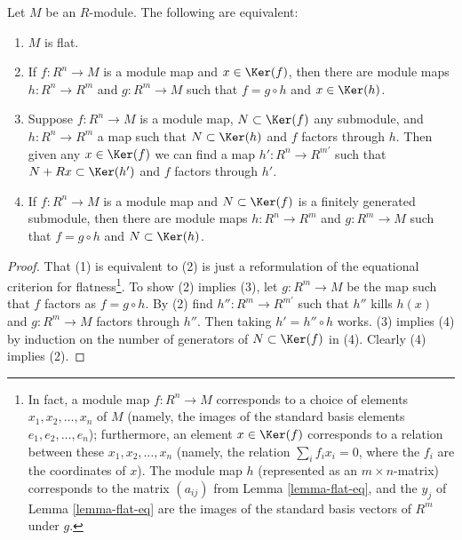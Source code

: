 \begin{lemma}
\label{lemma-flat-factors-free}
Let $M$ be an $R$-module.  The following are equivalent:
\begin{enumerate}
\item $M$ is flat.
\item If $f: R^n \to M$ is a module map and $x \in \Ker(f)$, then there
are module maps $h: R^n \to R^m$ and $g: R^m \to M$ such that
$f = g \circ h$ and $x \in \Ker(h)$.
\item Suppose $f: R^n \to M$ is a module map, $N \subset \Ker(f)$ any
submodule, and $h: R^n \to R^{m}$ a map such that $N \subset \Ker(h)$
and $f$ factors through $h$.  Then given any $x \in \Ker(f)$ we can find a map
$h': R^n \to R^{m'}$ such that $N + Rx \subset \Ker(h')$ and $f$
factors through $h'$.
\item If $f: R^n \to M$ is a module map and $N \subset \Ker(f)$ is a
finitely generated submodule, then there are module maps $h: R^n \to
R^m$ and $g: R^m \to M$ such that $f = g \circ h$ and $N \subset
\Ker(h)$.
\end{enumerate}
\end{lemma}

\begin{proof}
That (1) is equivalent to (2) is just a reformulation of the equational
criterion for flatness\footnote{In fact, a module map $f : R^n \to M$
corresponds to a choice of elements $x_1, x_2, \ldots, x_n$ of $M$
(namely, the images of the standard basis elements $e_1, e_2, \ldots,
e_n$); furthermore, an element $x \in \Ker(f)$ corresponds to a
relation between these $x_1, x_2, \ldots, x_n$ (namely, the relation
$\sum_i f_i x_i = 0$, where the $f_i$ are the coordinates of $x$).
The module map $h$ (represented as an $m \times n$-matrix)
corresponds to the matrix $(a_{ij})$ from Lemma \ref{lemma-flat-eq},
and the $y_j$ of Lemma \ref{lemma-flat-eq} are the images of the
standard basis vectors of $R^m$ under $g$.}.   To show
(2) implies (3), let $g: R^m \to M$
be the map such that $f$ factors as $f = g \circ h$.  By (2) find $h'': R^m
\to R^{m'}$ such that $h''$ kills $h(x)$ and $g: R^m \to M$
factors through $h''$.  Then taking $h' = h'' \circ h$ works.  (3) implies (4)
by induction on the number of generators of $N \subset \Ker(f)$ in (4).
Clearly (4) implies (2).
\end{proof}
